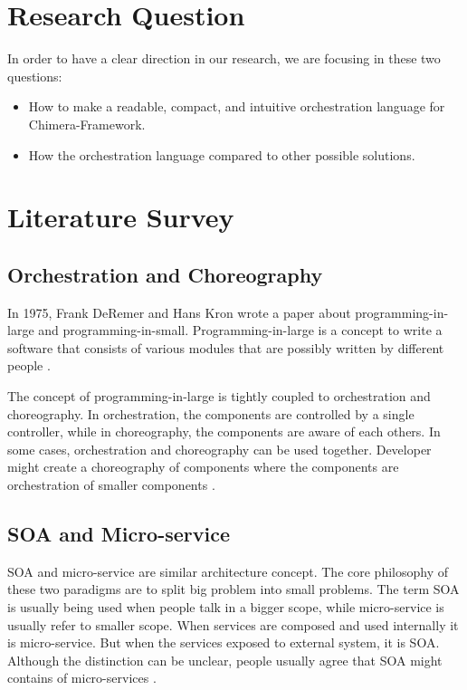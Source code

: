 \documentclass[conference]{IEEEtran}
\begin{document}
\section{Research Question}

In order to have a clear direction in our research, we are focusing in these two questions:

\begin{itemize}
    \item How to make a readable, compact, and intuitive orchestration language for Chimera-Framework.
    \item How the orchestration language compared to other possible solutions.
\end{itemize}


\section{Literature Survey}

\subsection{Orchestration and Choreography}

In 1975, Frank DeRemer and Hans Kron wrote a paper about programming-in-large and programming-in-small. Programming-in-large is a concept to write a software that consists of various modules that are possibly written by different people \cite{DeRemer:1975:PLV:390016.808431}.

The concept of programming-in-large is tightly coupled to orchestration and choreography. In orchestration, the components are controlled by a single controller, while in choreography, the components are aware of each others. In some cases, orchestration and choreography can be used together. Developer might create a choreography of components where the components are orchestration of smaller components \cite{orchestrationvschoreography}. 

\subsection{SOA and Micro-service}

SOA and micro-service are similar architecture concept. The core philosophy of these two paradigms are to split big problem into small problems. The term SOA is usually being used when people talk in a bigger scope, while micro-service is usually refer to smaller scope. When services are composed and used internally it is micro-service. But when the services exposed to external system, it is SOA. Although the distinction can be unclear, people usually agree that SOA might contains of micro-services \cite{soavsmicroservice}.
\end{document}
